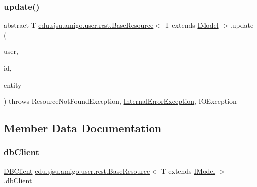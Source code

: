 \subsubsection{\texorpdfstring{update()}{update()}}
{\footnotesize\ttfamily abstract T \hyperlink{classedu_1_1sjsu_1_1amigo_1_1user_1_1rest_1_1_base_resource}{edu.\+sjsu.\+amigo.\+user.\+rest.\+Base\+Resource}$<$ T extends \hyperlink{interfaceedu_1_1sjsu_1_1amigo_1_1db_1_1common_1_1model_1_1_i_model}{I\+Model} $>$.update (\begin{DoxyParamCaption}\item[{@Auth \hyperlink{classedu_1_1sjsu_1_1amigo_1_1user_1_1auth_1_1_principal_user}{Principal\+User}}]{user,  }\item[{@Path\+Param(\char`\"{}id\char`\"{}) String}]{id,  }\item[{@Valid String}]{entity }\end{DoxyParamCaption}) throws Resource\+Not\+Found\+Exception, \hyperlink{classedu_1_1sjsu_1_1amigo_1_1user_1_1rest_1_1_internal_error_exception}{Internal\+Error\+Exception}, I\+O\+Exception\hspace{0.3cm}{\ttfamily [abstract]}}



\subsection{Member Data Documentation}
\mbox{\label{classedu_1_1sjsu_1_1amigo_1_1user_1_1rest_1_1_base_resource_a5f2d4befed6cbdcf6f0d9f4757875db5}} 
\subsubsection{\texorpdfstring{db\+Client}{dbClient}}
{\footnotesize\ttfamily \hyperlink{interfaceedu_1_1sjsu_1_1amigo_1_1db_1_1common_1_1_d_b_client}{D\+B\+Client} \hyperlink{classedu_1_1sjsu_1_1amigo_1_1user_1_1rest_1_1_base_resource}{edu.\+sjsu.\+amigo.\+user.\+rest.\+Base\+Resource}$<$ T extends \hyperlink{interfaceedu_1_1sjsu_1_1amigo_1_1db_1_1common_1_1model_1_1_i_model}{I\+Model} $>$.db\+Client\hspace{0.3cm}{\ttfamily [protected]}}



